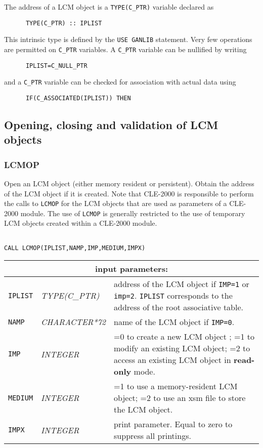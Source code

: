 The address of a LCM object is a {\tt TYPE(C\_PTR)} variable declared as
\begin{verbatim}
      TYPE(C_PTR) :: IPLIST
\end{verbatim}
\noindent This intrinsic type is defined by the {\tt USE GANLIB} statement. Very few operations are permitted on
{\tt C\_PTR} variables. A {\tt C\_PTR} variable can be nullified by writing
\begin{verbatim}
      IPLIST=C_NULL_PTR
\end{verbatim}
\noindent and a {\tt C\_PTR} variable can be checked for association with actual data using
\begin{verbatim}
      IF(C_ASSOCIATED(IPLIST)) THEN
\end{verbatim}

\vskip 0.8cm

\subsection{Opening, closing and validation of LCM objects}

\subsubsection{LCMOP}

Open an LCM object (either memory resident or persistent). Obtain the address of the LCM
object if it is created. Note that CLE-2000 is responsible to perform the calls to {\tt LCMOP} for the LCM
objects that are used as parameters of a CLE-2000 module. The use
of {\tt LCMOP} is generally restricted to the use of temporary LCM objects created within a CLE-2000 module.
\begin{verbatim}

CALL LCMOP(IPLIST,NAMP,IMP,MEDIUM,IMPX)
\end{verbatim}

\noindent
\begin{tabular}{|p{1.5cm}|p{3cm}|p{10cm}|}
\hline
\multicolumn{3}{|c|}{\bf input parameters:} \\
\hline
{\tt IPLIST} & {\it TYPE(C\_PTR)} & address of the LCM object if {\tt IMP=1} or {\tt imp=2}. {\tt IPLIST} corresponds to the address of the root associative table. \\
\hline
{\tt NAMP} & {\it CHARACTER*72} & name of the LCM object if  {\tt IMP=0}. \\
\hline
{\tt IMP} & {\it INTEGER} & =0 to create a new LCM object ; 
                                  =1 to modify an existing LCM object; 
				  =2 to access an existing LCM object in {\bf read-only} mode. \\
\hline
{\tt MEDIUM} & {\it INTEGER} & =1 to use a memory-resident LCM object; 
                                     =2 to use an {\sc xsm} file to store the LCM object. \\
\hline
{\tt IMPX} & {\it INTEGER} & print parameter. Equal to zero to suppress all printings. \\
\hline
\end{tabular}

